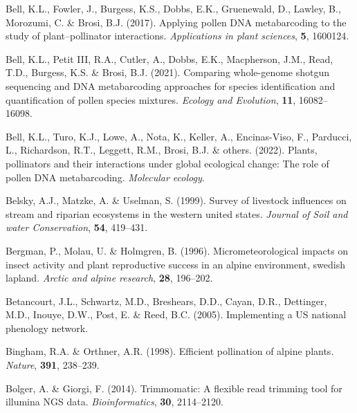 \documentclass[
]{article}
\newlength{\cslhangindent}
\newlength{\cslentryspacingunit} %
\newenvironment{CSLReferences}[2] %
 {%
  \setlength{\parindent}{0pt}
  \ifodd #1
  \let\oldpar\par
  \def\par{\hangindent=\cslhangindent\oldpar}
  \fi
  \setlength{\parskip}{#2\cslentryspacingunit}
 }%
 {}
\begin{document}
\begin{CSLReferences}{1}{0}
\leavevmode{}%
Bell, K.L., Fowler, J., Burgess, K.S., Dobbs, E.K., Gruenewald, D.,
Lawley, B., Morozumi, C. \& Brosi, B.J. (2017). Applying pollen DNA
metabarcoding to the study of plant--pollinator interactions.
\emph{Applications in plant sciences}, \textbf{5}, 1600124.

\leavevmode{}%
Bell, K.L., Petit III, R.A., Cutler, A., Dobbs, E.K., Macpherson, J.M.,
Read, T.D., Burgess, K.S. \& Brosi, B.J. (2021). Comparing whole-genome
shotgun sequencing and DNA metabarcoding approaches for species
identification and quantification of pollen species mixtures.
\emph{Ecology and Evolution}, \textbf{11}, 16082--16098.

\leavevmode{}%
Bell, K.L., Turo, K.J., Lowe, A., Nota, K., Keller, A., Encinas-Viso,
F., Parducci, L., Richardson, R.T., Leggett, R.M., Brosi, B.J. \&
others. (2022). Plants, pollinators and their interactions under global
ecological change: The role of pollen DNA metabarcoding. \emph{Molecular
ecology}.

\leavevmode{}%
Belsky, A.J., Matzke, A. \& Uselman, S. (1999). Survey of livestock
influences on stream and riparian ecosystems in the western united
states. \emph{Journal of Soil and water Conservation}, \textbf{54},
419--431.

\leavevmode{}%
Bergman, P., Molau, U. \& Holmgren, B. (1996). Micrometeorological
impacts on insect activity and plant reproductive success in an alpine
environment, swedish lapland. \emph{Arctic and alpine research},
\textbf{28}, 196--202.

\leavevmode{}%
Betancourt, J.L., Schwartz, M.D., Breshears, D.D., Cayan, D.R.,
Dettinger, M.D., Inouye, D.W., Post, E. \& Reed, B.C. (2005).
Implementing a US national phenology network.

\leavevmode{}%
Bingham, R.A. \& Orthner, A.R. (1998). Efficient pollination of alpine
plants. \emph{Nature}, \textbf{391}, 238--239.

\leavevmode{}%
Bolger, A. \& Giorgi, F. (2014). Trimmomatic: A flexible read trimming
tool for illumina NGS data. \emph{Bioinformatics}, \textbf{30},
2114--2120.


\end{CSLReferences}
\end{document}
